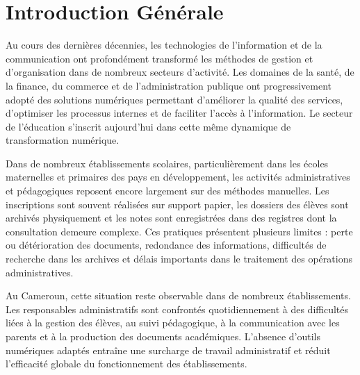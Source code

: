 \documentclass[12pt, a4paper]{report}
\begin{document}
\tableofcontents

\listoffigures
{}

\listoftables
{}

\chapter*{Introduction Générale}

Au cours des dernières décennies, les technologies de l'information et de la communication ont profondément transformé les méthodes de gestion et d'organisation dans de nombreux secteurs d'activité. Les domaines de la santé, de la finance, du commerce et de l'administration publique ont progressivement adopté des solutions numériques permettant d'améliorer la qualité des services, d'optimiser les processus internes et de faciliter l'accès à l'information. Le secteur de l'éducation s'inscrit aujourd'hui dans cette même dynamique de transformation numérique.

Dans de nombreux établissements scolaires, particulièrement dans les écoles maternelles et primaires des pays en développement, les activités administratives et pédagogiques reposent encore largement sur des méthodes manuelles. Les inscriptions sont souvent réalisées sur support papier, les dossiers des élèves sont archivés physiquement et les notes sont enregistrées dans des registres dont la consultation demeure complexe. Ces pratiques présentent plusieurs limites : perte ou détérioration des documents, redondance des informations, difficultés de recherche dans les archives et délais importants dans le traitement des opérations administratives.

Au Cameroun, cette situation reste observable dans de nombreux établissements. Les responsables administratifs sont confrontés quotidiennement à des difficultés liées à la gestion des élèves, au suivi pédagogique, à la communication avec les parents et à la production des documents académiques. L'absence d'outils numériques adaptés entraîne une surcharge de travail administratif et réduit l'efficacité globale du fonctionnement des établissements.
\end{document}

